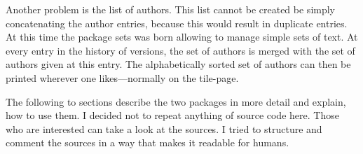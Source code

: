 Another problem is the list of authors. This list cannot be created be simply concatenating the author entries, because this would result in duplicate entries. At this time the package sets was born allowing to manage simple sets of text. At every entry in the history of versions, the set of authors is merged with the set of authors given at this entry. The alphabetically sorted set of authors can then be printed wherever one likes---normally on the tile-page.

The following to sections describe the two packages in more detail and explain, how to use them. I decided not to repeat anything of source code here. Those who are interested can take a look at the sources. I tried to structure and comment the sources in a way that makes it readable for humans.